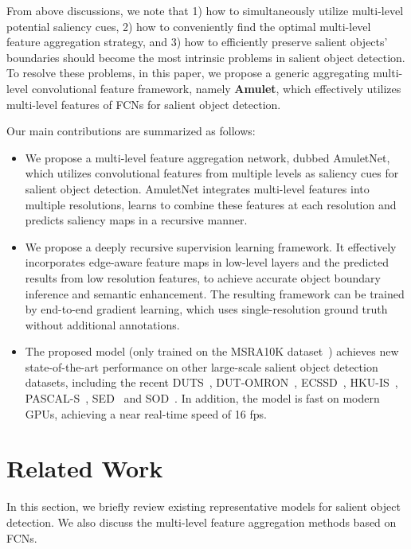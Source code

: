\documentclass[10pt,twocolumn,letterpaper]{article}
\begin{document}
From above discussions, we note that 1) how to simultaneously utilize multi-level potential saliency cues, 2) how to conveniently find the optimal multi-level feature aggregation strategy, and 3) how to efficiently preserve salient objects' boundaries should become the most intrinsic problems in salient object detection.
To resolve these problems, in this paper, we propose a generic aggregating multi-level convolutional feature framework, namely \textbf{Amulet}, which effectively utilizes multi-level features of FCNs for salient object detection.


Our main contributions are summarized as follows:
\begin{itemize}
\vspace{-2mm}
 \item
We propose a multi-level feature aggregation network, dubbed AmuletNet, which utilizes convolutional features from multiple levels as saliency cues for salient object detection.
AmuletNet integrates multi-level features into multiple resolutions, learns to combine these features at each resolution and predicts saliency maps in a recursive manner.
\vspace{-2mm}
 \item
We propose a deeply recursive supervision learning framework. It effectively incorporates edge-aware feature maps in low-level layers and the predicted results from low resolution features, to achieve accurate object boundary inference and semantic enhancement.
The resulting framework can be trained by end-to-end gradient learning, which uses single-resolution ground truth without additional annotations.
 \vspace{-2mm}
\item
The proposed model (only trained on the MSRA10K dataset~\cite{ChengPAMI}) achieves new state-of-the-art performance on other large-scale salient object detection datasets, including the recent DUTS~\cite{Wang2017CVPR}, DUT-OMRON~\cite{yang2013saliency}, ECSSD~\cite{yan2013hierarchical}, HKU-IS~\cite{zhao2015saliency}, PASCAL-S~\cite{li2014secrets}, SED~\cite{borj2015salient} and SOD~\cite{yan2013hierarchical}.
In addition, the model is fast on modern GPUs, achieving a near real-time speed of 16 fps.
\end{itemize}

\section{Related Work}
In this section, we briefly review existing representative models for salient object detection.
We also discuss the multi-level feature aggregation methods based on FCNs.
\end{document}
